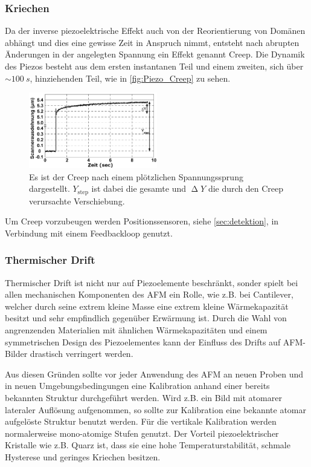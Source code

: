     \subsubsection*{Kriechen} \vspace*{-0.25cm}
        Da der inverse piezoelektrische Effekt auch von der Reorientierung von Domänen abhängt und dies eine gewisse Zeit in Anspruch nimmt, entsteht nach abrupten Änderungen in der angelegten Spannung ein Effekt genannt \glqq Creep\grqq.
        Die Dynamik des Piezos besteht aus dem ersten instantanen Teil und einem zweiten, sich über $\sim \SI{100}{s}$, hinziehenden Teil, wie in \autoref{fig:Piezo_Creep} zu sehen.
        \begin{figure}[ht]
            \centering\captionsetup{format=plain}
            \includegraphics[width=0.5\textwidth]{bilder/Piezo_Creep.png}
            \caption{Es ist der Creep nach einem plötzlichen Spannungssprung dargestellt. $Y_{\mathrm{step}}$ ist dabei die gesamte und $\upDelta Y$ die durch den Creep verursachte Verschiebung. \cite{Compensation_of_Scanner_Creep}}
            \label{fig:Piezo_Creep}
        \end{figure}
        Um Creep vorzubeugen werden Positionssensoren, siehe \autoref{sec:detektion}, in Verbindung mit einem Feedbackloop genutzt.
        

    \subsubsection*{Thermischer Drift} \vspace*{-0.25cm}
        Thermischer Drift ist nicht nur auf Piezoelemente beschränkt, sonder spielt bei allen mechanischen Komponenten des AFM ein Rolle, wie z.B. bei Cantilever, welcher durch seine extrem kleine Masse eine extrem kleine Wärmekapazität besitzt und sehr empfindlich gegenüber Erwärmung ist.
        Durch die Wahl von angrenzenden Materialien mit ähnlichen Wärmekapazitäten und einem symmetrischen Design des Piezoelementes kann der Einfluss des Drifts auf AFM-Bilder drastisch verringert werden.
        
    \vspace*{0.5cm}
    Aus diesen Gründen sollte vor jeder Anwendung des AFM an neuen Proben und in neuen Umgebungsbedingungen eine Kalibration anhand einer bereits bekannten Struktur durchgeführt werden.
    Wird z.B. ein Bild mit atomarer lateraler Auflösung aufgenommen, so sollte zur Kalibration eine bekannte atomar aufgelöste Struktur benutzt werden.
    Für die vertikale Kalibration werden normalerweise mono-atomige Stufen genutzt.
    Der Vorteil piezoelektrischer Kristalle wie z.B. Quarz ist, dass sie eine hohe Temperaturstabilität, schmale Hysterese und geringes Kriechen besitzen.